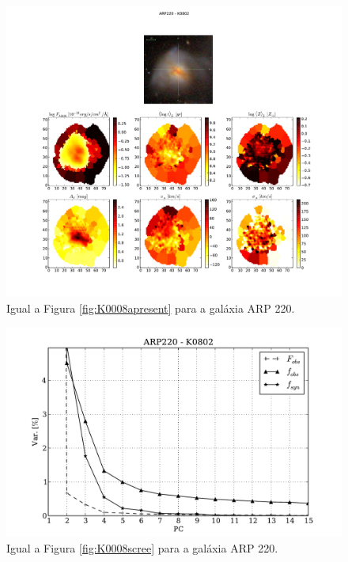 \begin{figure}
    \includegraphics[width=1.\textwidth]{figuras/K0802-apresent.pdf}
    \caption[Propriedades f\'isicas da gal\'axia ARP 220.]
    {Igual a Figura \ref{fig:K0008apresent} para a galáxia ARP 220.}
    \label{fig:K0802apresent}
\end{figure}

\begin{figure}
    \includegraphics[height=0.33\textheight]{figuras/K0802-screetest.pdf}
    \caption[Scree test comparativo entre 3 PCAs - ARP 220.]
	{Igual a Figura \ref{fig:K0008scree} para a galáxia ARP 220.}
    \label{fig:K0802scree}
\end{figure}

